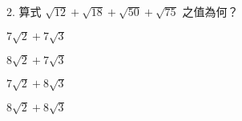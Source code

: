 \documentclass[12pt]{article}
\begin{document}
\begin{problem}
  \item[2.] 算式 $\sqrt{12} + \sqrt{18} + \sqrt{50} + \sqrt{75}$ 之值為何？
  \begin{choices}
    \item $7\sqrt{2} + 7\sqrt{3}$
    \item $8\sqrt{2} + 7\sqrt{3}$
    \item $7\sqrt{2} + 8\sqrt{3}$
    \item $8\sqrt{2} + 8\sqrt{3}$
  \end{choices}
\end{problem}
\end{document}
